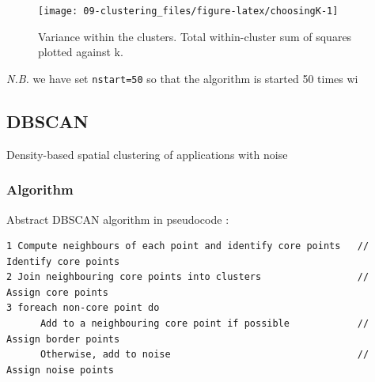 \documentclass[]{book}
\newenvironment{Shaded}{\begin{snugshade}}{\end{snugshade}}
\newcommand{\KeywordTok}[1]{\textcolor[rgb]{0.13,0.29,0.53}{\textbf{{#1}}}}
\newcommand{\DataTypeTok}[1]{\textcolor[rgb]{0.13,0.29,0.53}{{#1}}}
\newcommand{\StringTok}[1]{\textcolor[rgb]{0.31,0.60,0.02}{{#1}}}
\newcommand{\NormalTok}[1]{{#1}}
\theoremstyle{definition}
\theoremstyle{definition}
\theoremstyle{definition}
\theoremstyle{remark}
\begin{document}
\begin{Shaded}
\end{Shaded}

\begin{figure}

{\centering \texttt{[image: 09-clustering\_files/figure-latex/choosingK-1]} 

}

\caption{Variance within the clusters. Total within-cluster sum of squares plotted against k.}\label{fig:choosingK}
\end{figure}

\emph{N.B.} we have set \texttt{nstart=50} so that the algorithm is
started 50 times wi

\subsection{DBSCAN}\label{dbscan}

Density-based spatial clustering of applications with noise

\subsubsection{Algorithm}\label{algorithm-1}

Abstract DBSCAN algorithm in pseudocode \citep{Schubert2017}:

\begin{verbatim}
1 Compute neighbours of each point and identify core points   // Identify core points
2 Join neighbouring core points into clusters                 // Assign core points
3 foreach non-core point do
      Add to a neighbouring core point if possible            // Assign border points
      Otherwise, add to noise                                 // Assign noise points
\end{verbatim}
\end{document}
